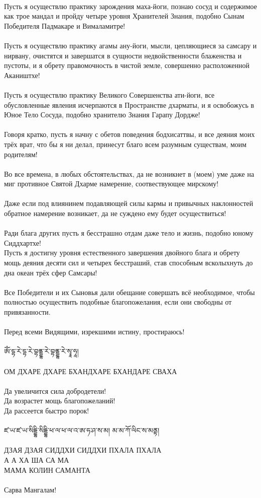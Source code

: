 \\
Пусть я осуществлю практику зарождения маха-йоги,
познаю сосуд и содержимое как трое мандал и пройду четыре
уровня Хранителей Знания, подобно Сынам Победителя
Падмакаре и Вималамитре!\\
\\
Пусть я осуществлю практику агамы ану-йоги, мысли,
цепляю\-щиеся за самсару и нирвану, очистятся и завершатся
в сущности недвойственности блаженства и пустоты,
и я обрету правомочность в чистой земле,
совершенно расположенной Акаништхе!\\
\\
Пусть я осуществлю практику Великого Совершенства ати-йоги,
все обусловленные явления исчерпаются в Пространстве дхарматы,
и я освобожусь в Юное Тело Сосуда, подобно хранителю
Знания Гарапу Дордже!\\
\\
Говоря кратко, пусть я начну с обетов поведения бодхисаттвы,
и все деяния моих трёх врат, что бы я ни делал,
принесут благо всем разумным существам, моим родителям!\\
\\
Во все времена, в любых обстоятельствах, да не возникнет
в (моем) уме даже на миг противное Святой Дхарме намерение,
соотвествующее мирскому!\\
\\
Даже если под влиянинем подавляющей силы кармы и
привыч\-ных наклонностей обратное намерение возникает,
да не сужде\-но ему будет осуществиться!\\
\\
Ради блага других пусть я бесстрашно отдам даже тело и жизнь,
подобно юному Сиддхартхе!\\
\newpage
Пусть я достигну уровня естественного завершения двойного блага
и обрету мощь деяния десяти сил и четырех бесстраший,
став способным всколыхнуть до дна океан трёх сфер Самсары!\\
\\
Все Победители и их Сыновья дали обещание совершать всё
необходимое, чтобы полностью осуществить подобные благопожелания,
если они свободны от привязанности.\\
\\
Перед всеми Видящими, изрекшими истину, простираюсь!
\\
\\
\ti
ཨོཾ་དྷ་རེ་དྷ་རེ་བྷནྡྷ་རེ་བྷནྡྷ་རེ་སྭཱ་ཧཱ། \\
\\
\ru
ОМ ДХАРЕ ДХАРЕ БХАНДХАРЕ БХАНДАРЕ СВАХА\\
\\
\noindent
Да увеличится сила добродетели!\\
Да возрастет мощь благопожеланий!\\
Да рассеется быстро порок!\\
\\
\ti ཛ་ཡ་ཛ་ཡ་སིདྡྷི་སིདྡྷི་ཕ་ལ་ཕ་ལ་འ་ཨ་ཧ་ཤ་ས་མ། མ་མ་ཀོ་ལིང་ས་མནྟ། \\
\\
\ru ДЗАЯ ДЗАЯ СИДДХИ СИДДХИ ПХАЛА ПХАЛА\\
А А ХА ША СА МА\\
МАМА КОЛИН САМАНТА\\
\\
\scriptsize
\ru Сарва Мангалам!
\normalsize
